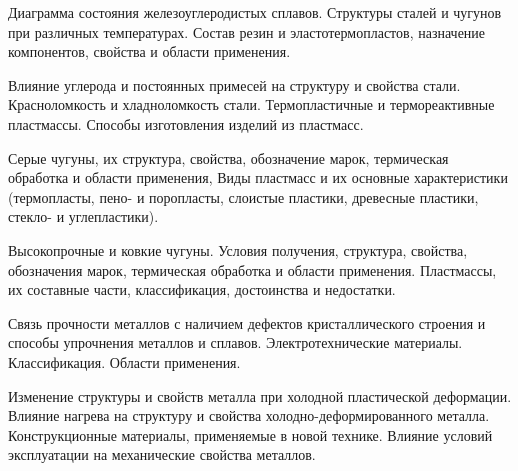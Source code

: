 \documentclass[
	14pt,
	a4paper,
	]
	{scrartcl}
\begin{document}
\vfill

\newpage


\shapk
{}
\setcounter{zad}{0}

\vfill
\z Диаграмма состояния железоуглеродистых сплавов. Структуры сталей и чугунов при различных температурах.
 \vfill
\z Состав резин и эластотермопластов, назначение компонентов, свойства и области применения.
 \vfill

\vfill

\newpage


\shapk
{}
\setcounter{zad}{0}

\vfill
\z Влияние углерода и постоянных примесей на структуру и свойства стали. Красноломкость и хладноломкость стали.
 \vfill
\z Термопластичные и термореактивные пластмассы. Способы изготовления изделий из пластмасс.
 \vfill

\vfill

\newpage


\shapk
{}
\setcounter{zad}{0}

\vfill
\z Серые чугуны, их структура, свойства, обозначение марок, термическая обработка и области применения,
 \vfill
\z Виды пластмасс и их основные характеристики (термопласты, пено- и поропласты, слоистые пластики, древесные пластики, стекло- и углепластики).
 \vfill

\vfill

\newpage


\shapk
{}
\setcounter{zad}{0}

\vfill
\z Высокопрочные и ковкие чугуны. Условия получения, структура, свойства, обозначения марок, термическая обработка и области применения.
 \vfill
\z Пластмассы, их составные части, классификация, достоинства и недостатки.
 \vfill

\vfill

\newpage


\shapk
{}
\setcounter{zad}{0}

\vfill
\z Связь прочности металлов с наличием дефектов кристаллического строения и способы упрочнения металлов и сплавов.
 \vfill
\z Электротехнические материалы. Классификация. Области применения.
 \vfill

\vfill

\newpage


\shapk
{}
\setcounter{zad}{0}

\vfill
\z Изменение структуры и свойств металла при холодной пластической деформации. Влияние нагрева на структуру и свойства холодно-деформированного металла.
 \vfill
\z Конструкционные материалы, применяемые в новой технике. Влияние условий эксплуатации на механические свойства металлов.
 \vfill
\end{document}
